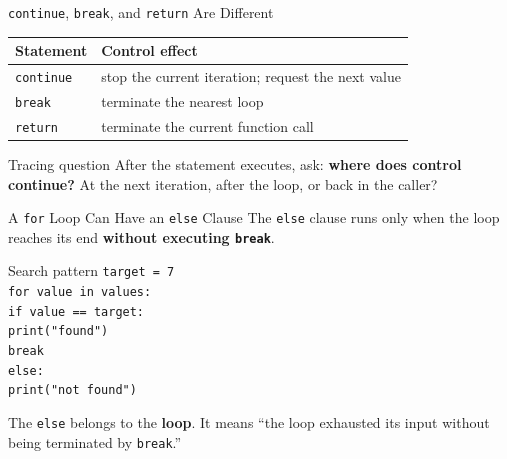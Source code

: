 \documentclass[aspectratio=169,10pt]{beamer}
\begin{document}
\begin{frame}{\texttt{continue}, \texttt{break}, and \texttt{return} Are Different}
  \begin{center}
    \renewcommand{\arraystretch}{1.35}
    \begin{tabular}{l|l}
      \textbf{Statement} & \textbf{Control effect} \\\hline
      \texttt{continue} & stop the current iteration; request the next value \\
      \texttt{break} & terminate the nearest loop \\
      \texttt{return} & terminate the current function call
    \end{tabular}
  \end{center}

  \begin{alertblock}{Tracing question}
    After the statement executes, ask: \textbf{where does control continue?} At the next iteration, after the loop, or back in the caller?
  \end{alertblock}
\end{frame}

\begin{frame}{A \texttt{for} Loop Can Have an \texttt{else} Clause}
  The \texttt{else} clause runs only when the loop reaches its end \textbf{without executing \texttt{break}}.

  \begin{block}{Search pattern}
    \texttt{target = 7}\\
    \texttt{for value in values:}\\
    \hspace{0.20in}\texttt{if value == target:}\\
    \hspace{0.40in}\texttt{print("found")}\\
    \hspace{0.40in}\texttt{break}\\
    \texttt{else:}\\
    \hspace{0.20in}\texttt{print("not found")}
  \end{block}

  \begin{keyidea}
    The \texttt{else} belongs to the \textbf{loop}. It means ``the loop exhausted its input without being terminated by \texttt{break}.''
  \end{keyidea}
\end{frame}
\end{document}
